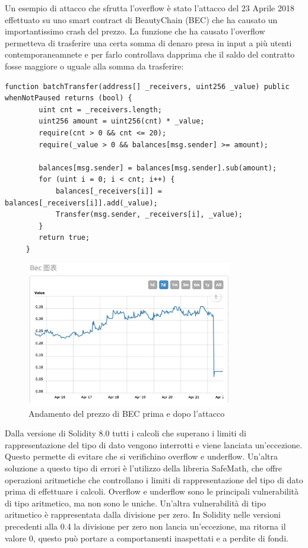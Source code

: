 \documentclass[../../Thesis.tex]{subfiles}
\begin{document}
Un esempio di attacco che sfrutta l'overflow è stato l'attacco del 23 Aprile 2018 effettuato su uno smart contract di BeautyChain (BEC) che ha causato un importantissimo crash del prezzo. La funzione che ha causato l'overflow permetteva di trasferire una certa somma di denaro presa in input a più utenti contemporaneamnete e per farlo controllava dapprima che il saldo del contratto fosse maggiore o uguale alla somma da trasferire:
\begin{lstlisting}[language=Solidity]
    function batchTransfer(address[] _receivers, uint256 _value) public whenNotPaused returns (bool) {
        uint cnt = _receivers.length;
        uint256 amount = uint256(cnt) * _value;
        require(cnt > 0 && cnt <= 20);
        require(_value > 0 && balances[msg.sender] >= amount);
    
        balances[msg.sender] = balances[msg.sender].sub(amount);
        for (uint i = 0; i < cnt; i++) {
            balances[_receivers[i]] = balances[_receivers[i]].add(_value);
            Transfer(msg.sender, _receivers[i], _value);
        }
        return true;
     }
\end{lstlisting}
\begin{figure}[H]
    \centering
    \includegraphics[width=0.8\textwidth]{../../img/BECPrice.png}
    \caption{Andamento del prezzo di BEC prima e dopo  l'attacco}
    \label{fig:BECPrice}
\end{figure}
Dalla versione di Solidity 8.0  tutti i calcoli che superano i limiti di rappresentazione del tipo di dato vengono interrotti e viene lanciata un'eccezione. Questo permette di evitare che si verifichino overflow e underflow. Un'altra soluzione a questo tipo di errori è l'utilizzo della libreria SafeMath, che offre operazioni aritmetiche che controllano i limiti di rappresentazione del tipo di dato prima di effettuare i calcoli. Overflow e underflow sono le principali vulnerabilità di tipo aritmetico, ma non sono le uniche. Un'altra vulnerabilità di tipo aritmetico è rappresentata dalla divisione per zero. In Solidity nelle versioni precedenti alla 0.4 la divisione per zero non lancia un'eccezione, ma ritorna il valore 0, questo può portare a comportamenti inaspettati e a perdite di fondi.
\end{document}
